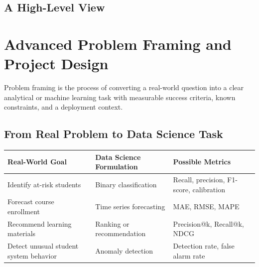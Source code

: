 \documentclass[11pt,a4paper]{article}
\begin{document}
\subsection{A High-Level View}

\begin{center}
\end{center}

\section{Advanced Problem Framing and Project Design}

\begin{definitionbox}
Problem framing is the process of converting a real-world question into a clear analytical or machine learning task with measurable success criteria, known constraints, and a deployment context.
\end{definitionbox}

\subsection{From Real Problem to Data Science Task}

\begin{longtable}{@{}p{4.0cm}p{4.0cm}p{5.0cm}@{}}
\toprule
\rowcolor{primary!15}
\textbf{Real-World Goal} & \textbf{Data Science Formulation} & \textbf{Possible Metrics} \\
\midrule
\endhead
Identify at-risk students & Binary classification & Recall, precision, F1-score, calibration \\
\addlinespace
Forecast course enrollment & Time series forecasting & MAE, RMSE, MAPE \\
\addlinespace
Recommend learning materials & Ranking or recommendation & Precision@k, Recall@k, NDCG \\
\addlinespace
Detect unusual student system behavior & Anomaly detection & Detection rate, false alarm rate \\
\bottomrule
\end{longtable}
\end{document}
